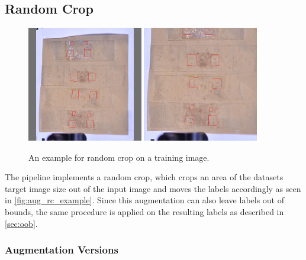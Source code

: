 \documentclass[10pt]{book}
\newcommand{\figureref}[1]{\autoref{#1}}
\begin{document}
\subsection{Random Crop}

\begin{figure}
  \centering
     {\includegraphics[width=0.45\textwidth]{image/aug_rc_before}}
     {\includegraphics[width=0.45\textwidth]{image/aug_rc_after}}
  \caption{An example for random crop on a training image.}
  \label{fig:aug_rc_example}
\end{figure}

The pipeline implements a random crop, which crops an area of the datasets target image size out of the input image and moves the labels accordingly as seen in \figureref{fig:aug_rc_example}. Since this augmentation can also leave labels out of bounds, the same procedure is applied on the resulting labels as described in \autoref{sec:oob}.

\subsubsection{Augmentation Versions}
\end{document}
